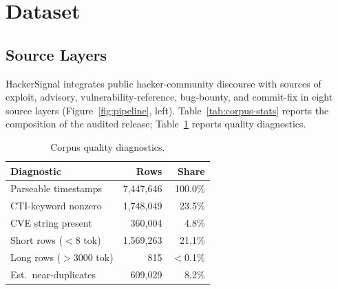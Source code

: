 \documentclass{article}
\begin{document}
\section{Dataset}
\label{sec:dataset}

\subsection{Source Layers}

HackerSignal integrates public hacker-community discourse with sources of exploit, advisory, vulnerability-reference, bug-bounty, and commit-fix in eight source layers (Figure~\ref{fig:pipeline}, left). Table~\ref{tab:corpus-stats} reports the composition of the audited release; Table~\ref{tab:quality-audit} reports quality diagnostics.

\begin{table}[t]
\vspace{-4pt}
\centering
\small
\setlength{\tabcolsep}{4pt}
\caption{Corpus quality diagnostics.}
\label{tab:quality-audit}
\begin{tabular}{lrr}
\toprule
\textbf{Diagnostic} & \textbf{Rows} & \textbf{Share} \\
\midrule
Parseable timestamps        & 7,447,646 & 100.0\% \\
CTI-keyword nonzero         & 1,748,049 &  23.5\% \\
CVE string present          &   360,004 &   4.8\% \\
Short rows ($<$8 tok)       & 1,569,263 &  21.1\% \\
Long rows ($>$3000 tok)     &       815 &  $<$0.1\% \\
Est.\ near-duplicates       &   609,029 &   8.2\% \\
\bottomrule
\end{tabular}
\vspace{-4pt}
\end{table}
\end{document}
